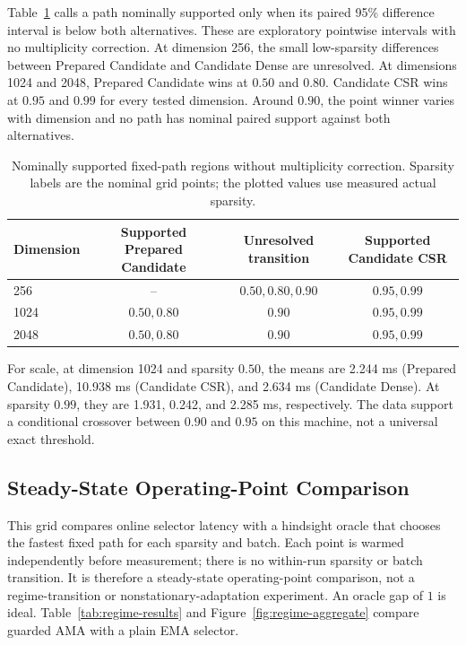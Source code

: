 \documentclass{article}
\newcommand{\ama}{\textsc{AMA}}
\begin{document}
Table~\ref{tab:crossover-winners} calls a path nominally supported only when
its paired 95\% difference interval is below both alternatives. These are
exploratory pointwise intervals with no multiplicity correction. At dimension
256, the small low-sparsity differences between Prepared Candidate and
Candidate Dense are unresolved. At dimensions 1024 and 2048, Prepared Candidate
wins at $0.50$ and $0.80$. Candidate CSR wins at $0.95$ and $0.99$ for every
tested dimension. Around $0.90$, the point winner varies with dimension and no
path has nominal paired support against both alternatives.

\begin{table}[t]
\centering
\caption{Nominally supported fixed-path regions without multiplicity
correction. Sparsity labels are the nominal grid points; the plotted values use
measured actual sparsity.}
\label{tab:crossover-winners}
\small
\begin{tabular}{lccc}
\toprule
Dimension & Supported Prepared Candidate & Unresolved transition & Supported Candidate CSR \\
\midrule
256 & -- & $0.50,0.80,0.90$ & $0.95,0.99$ \\
1024 & $0.50,0.80$ & $0.90$ & $0.95,0.99$ \\
2048 & $0.50,0.80$ & $0.90$ & $0.95,0.99$ \\
\bottomrule
\end{tabular}
\end{table}

For scale, at dimension 1024 and sparsity $0.50$, the means are 2.244 ms
(Prepared Candidate), 10.938 ms (Candidate CSR), and 2.634 ms (Candidate
Dense). At sparsity $0.99$, they are 1.931, 0.242, and 2.285 ms,
respectively. The data support a conditional crossover between $0.90$ and
$0.95$ on this machine, not a universal exact threshold.

\subsection{Steady-State Operating-Point Comparison}

This grid compares online selector latency with a hindsight oracle that chooses
the fastest fixed path for each sparsity and batch. Each point is warmed
independently before measurement; there is no within-run sparsity or batch
transition. It is therefore a steady-state operating-point comparison, not a
regime-transition or nonstationary-adaptation experiment. An oracle gap of $1$
is ideal. Table~\ref{tab:regime-results} and
Figure~\ref{fig:regime-aggregate} compare guarded \ama{} with a plain EMA
selector.
\end{document}

